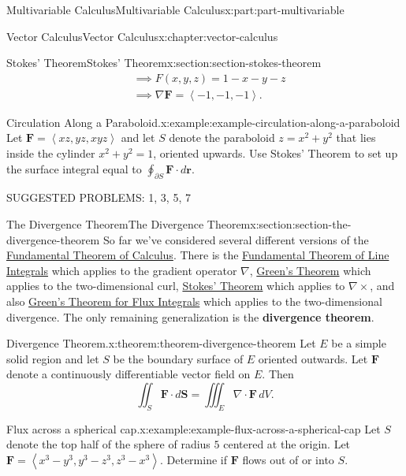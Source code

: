 \documentclass[twoside,10pt,]{book}
\newcommand{\terminology}[1]{\textbf{#1}}
\numberwithin{equation}{part}
\newcommand{\grad}{\nabla}
\newcommand{\curl}{\nabla\times}
\renewcommand{\div}{\nabla\cdot}
\newcommand{\vb}[1]{\mathbf{#1}}
\newcommand{\dotprod}[1]{\left\langle #1 \right\rangle}
\newcommand{\dr}{\cdot d\vb{r}}
\newcommand{\amp}{&}
\begin{document}
\begin{partptx}{Multivariable Calculus}{}{Multivariable Calculus}{}{}{x:part:part-multivariable}
\begin{chapterptx}{Vector Calculus}{}{Vector Calculus}{}{}{x:chapter:vector-calculus}
\begin{sectionptx}{Stokes' Theorem}{}{Stokes' Theorem}{}{}{x:section:section-stokes-theorem}
\begin{align*}
\amp \implies F(x,y,z) = 1 - x - y - z \\
\amp \implies \grad\vb{F} = \dotprod{-1, -1, -1} \text{.}
\end{align*}
%
\begin{example}{Circulation Along a Paraboloid.}{x:example:example-circulation-along-a-paraboloid}%
Let \(\vb{F} = \dotprod{xz, yz, xyz}\) and let \(S\) denote the paraboloid \(z = x^{2} + y^{2}\) that lies inside the cylinder \(x^{2} + y^{2} = 1\), oriented upwards. Use Stokes' Theorem to set up the surface integral equal to \(\oint_{\partial S}\vb{F}\dr\).%
\end{example}
SUGGESTED PROBLEMS: 1, 3, 5, 7%
\end{sectionptx}
%
%
\typeout{************************************************}
\typeout{************************************************}
%
\begin{sectionptx}{The Divergence Theorem}{}{The Divergence Theorem}{}{}{x:section:section-the-divergence-theorem}
So far we've considered several different versions of the \hyperref[x:theorem:theorem-fundamental-theorem-of-calculus]{Fundamental Theorem of Calculus}. There is the \hyperref[x:theorem:theorem-fundamental-theorem-line-integrals]{Fundamental Theorem of Line Integrals} which applies to the gradient operator \(\grad\), \hyperref[x:theorem:theorem-green-s-theorem]{Green's Theorem} which applies to the two-dimensional curl, \hyperref[x:theorem:theorem-stokes-theorem]{Stokes' Theorem} which applies to \(\curl\), and also \hyperref[x:theorem:theorem-green-s-theorem-for-flux-integrals]{Green's Theorem for Flux Integrals} which applies to the two-dimensional divergence. The only remaining generalization is the \terminology{divergence theorem}.%
\begin{theorem}{Divergence Theorem.}{}{x:theorem:theorem-divergence-theorem}%
Let \(E\) be a simple solid region and let \(S\) be the boundary surface of \(E\) oriented outwards. Let \(\vb{F}\) denote a continuously differentiable vector field on \(E\). Then%
\begin{equation*}
\iint_{S}\vb{F}\cdot d\vb{S} = \iiint_{E}\div\vb{F}\,dV\text{.}
\end{equation*}
%
\end{theorem}
\begin{example}{Flux across a spherical cap.}{x:example:example-flux-across-a-spherical-cap}%
Let \(S\) denote the top half of the sphere of radius \(5\) centered at the origin. Let \(\vb{F} = \dotprod{x^{3} - y^{3}, y^{3} - z^{3}, z^{3} - x^{3}}\). Determine if \(\vb{F}\) flows out of or into \(S\).%

\end{example}
\end{sectionptx}
\end{chapterptx}
\end{partptx}
\end{document}
